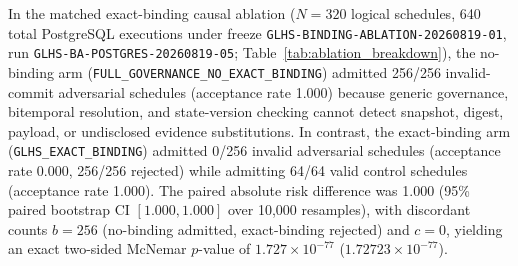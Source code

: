 \documentclass[11pt]{article}
\begin{document}
In the matched exact-binding causal ablation ($N=320$ logical schedules, 640 total PostgreSQL executions under freeze \nolinkurl{GLHS-BINDING-ABLATION-20260819-01}, run \nolinkurl{GLHS-BA-POSTGRES-20260819-05}; Table~\ref{tab:ablation_breakdown}), the no-binding arm (\texttt{FULL\_GOVERNANCE\_NO\_EXACT\_BINDING}) admitted 256/256 invalid-commit adversarial schedules (acceptance rate 1.000) because generic governance, bitemporal resolution, and state-version checking cannot detect snapshot, digest, payload, or undisclosed evidence substitutions. In contrast, the exact-binding arm (\texttt{GLHS\_EXACT\_BINDING}) admitted 0/256 invalid adversarial schedules (acceptance rate 0.000, 256/256 rejected) while admitting 64/64 valid control schedules (acceptance rate 1.000). The paired absolute risk difference was 1.000 (95\% paired bootstrap CI $[1.000, 1.000]$ over 10,000 resamples), with discordant counts $b=256$ (no-binding admitted, exact-binding rejected) and $c=0$, yielding an exact two-sided McNemar $p$-value of $1.727\times 10^{-77}$ ($1.72723\times 10^{-77}$). 
\end{document}
